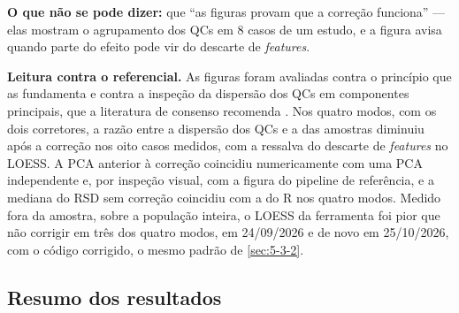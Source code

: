 
\textbf{O que não se pode dizer:} que ``as figuras provam que a correção funciona'' --- elas mostram o agrupamento dos QCs em 8 casos de um estudo, e a figura avisa quando parte do efeito pode vir do descarte de \textit{features}.

\textbf{Leitura contra o referencial.} As figuras foram avaliadas contra o princípio que as fundamenta e contra a inspeção da dispersão dos QCs em componentes principais, que a literatura de consenso recomenda \cite{broadhurst2018guidelines}. Nos quatro modos, com os dois corretores, a razão entre a dispersão dos QCs e a das amostras diminuiu após a correção nos oito casos medidos, com a ressalva do descarte de \textit{features} no LOESS. A PCA anterior à correção coincidiu numericamente com uma PCA independente e, por inspeção visual, com a figura do pipeline de referência, e a mediana do RSD sem correção coincidiu com a do R nos quatro modos. Medido fora da amostra, sobre a população inteira, o LOESS da ferramenta foi pior que não corrigir em três dos quatro modos, em 24/09/2026 e de novo em 25/10/2026, com o código corrigido, o mesmo padrão de \ref{sec:5-3-2}.

\subsection{Resumo dos resultados}\label{sec:5-3-8}

